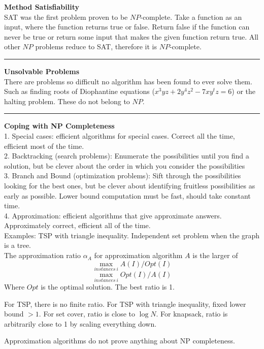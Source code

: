 \documentclass[9pt]{amsart}
\begin{document}
\begin{multicols*}{3}
  \textbf{Method Satisfiability} \\
  SAT was the first problem proven to be $NP$-complete. Take a function as an input, where the function returns true or false. Return false if the function can never be true or return some input that makes the given function return true. All other $NP$ problems reduce to SAT, therefore it is $NP$-complete. 

  \vskip 7pt
  \hrule
  \vskip 7pt

  \textbf{Unsolvable Problems} \\
  There are problems so difficult no algorithm has been found to ever solve them. Such as finding roots of Diophantine equations ($x^3yz + 2y^4z^2 - 7xy^tz = 6$) or the halting problem. These do not belong to $NP$.

  \vskip 7pt
  \hrule
  \vskip 7pt

  \textbf{Coping with NP Completeness} \\
  1. Special cases: efficient algorithms for special cases. Correct all the time, efficient most of the time. \\
  2. Backtracking (search problems): Enumerate the possibilities until you find a solution, but be clever about the order in which you consider the possibilities \\
  3. Branch and Bound (optimization problems): Sift through the possibilities looking for the best ones, but be clever about identifying fruitless possibilities as early as possible. Lower bound computation must be fast, should take constant time.\\
  4. Approximation: efficient algorithms that give approximate answers. Approximately correct, efficient all of the time. \\
  Examples: TSP with triangle inequality. Independent set problem when the graph is a tree. \\
  The approximation ratio $\alpha_A$ for approximation algorithm $A$ is the larger of
  \[
    \max_{instances\ i} A(I) / Opt(I)
  \]
  \[
    \max_{instances\ i} Opt(I) / A(I)
  \]
  Where $Opt$ is the optimal solution. The best ratio is 1.

  For TSP, there is no finite ratio. For TSP with triangle inequality, fixed lower bound $> 1$. For set cover, ratio is close to $\log N$. For knapsack, ratio is arbitrarily close to 1 by scaling everything down.

  Approximation algorithms do not prove anything about NP completeness.





\end{multicols*}
\end{document}
